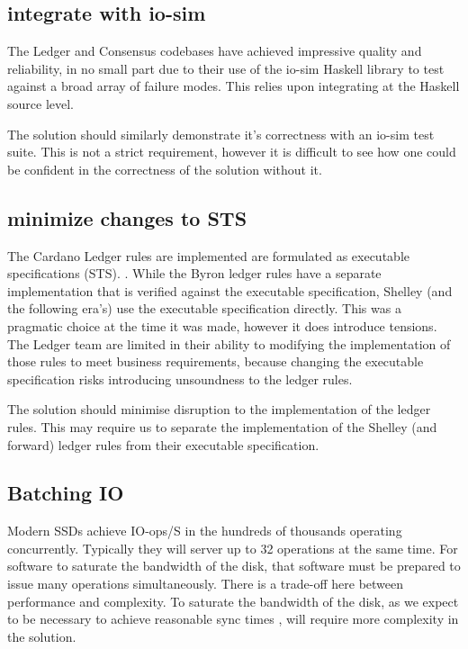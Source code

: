 \documentclass[11pt,a4paper]{article}
\begin{document}
\subsection{integrate with io-sim}
\label{io-sim}
The Ledger and Consensus codebases have achieved impressive quality
and reliability, in no small part due to their use of the io-sim
Haskell library to test against a broad array of failure modes. This
relies upon integrating at the Haskell source level.

The solution should similarly demonstrate it's correctness with an io-sim test
suite. This is not a strict requirement, however it is difficult to see how one
could be confident in the correctness of the solution without it.

\subsection{minimize changes to STS}

The Cardano Ledger rules are implemented are formulated as executable
specifications (STS). . While the Byron ledger rules have
a separate implementation that is verified against the executable specification,
Shelley (and the following era's) use the executable specification directly.
This was a pragmatic choice at the time it was made, however it does introduce
tensions. The Ledger team are limited in their ability to modifying the
implementation of those rules to meet business requirements, because changing
the executable specification risks introducing unsoundness to the ledger rules.

The solution should minimise disruption to the implementation of the ledger
rules. This may require us to separate the implementation of the Shelley (and
forward) ledger rules from their executable specification.

\subsection{Batching IO}
\label{Batching IO}
Modern SSDs achieve IO-ops/S in the hundreds of thousands operating concurrently.
Typically they will server up to 32 operations at the same time. For software to
saturate the bandwidth of the disk, that software must be prepared to issue many
operations simultaneously. There is a trade-off here between performance and
complexity. To saturate the bandwidth of the disk, as we expect to be necessary
to achieve reasonable sync times , will require more complexity in
the solution.
\end{document}
